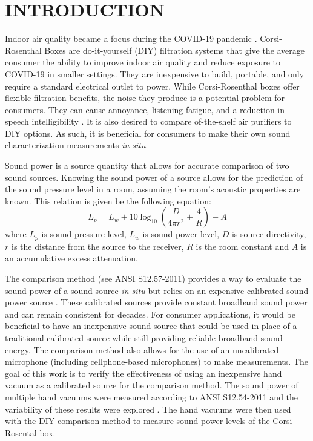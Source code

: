 \documentclass[letterpaper,12pt]{article}
\begin{document}
\section{INTRODUCTION}
\noindent

Indoor air quality became a focus during the COVID-19 pandemic \cite{mousavi2020covid, zhao2020air}.
Corsi-Rosenthal Boxes are do-it-yourself (DIY) filtration systems that give the average consumer the ability to improve indoor air quality and reduce exposure to COVID-19 in smaller settings\cite{dodson2022does, dal2022characterizing,rosenthal2022variation}. They are inexpensive to build, portable, and only require a standard electrical outlet to power. While Corsi-Rosenthal boxes offer flexible filtration benefits, the noise they produce is a potential problem for consumers. They can cause annoyance, listening fatigue, and a reduction in speech intelligibility \cite{houtgast1980predicting}. It is also desired to compare of-the-shelf air purifiers to DIY options. As such, it is beneficial for consumers to make their own sound characterization measurements \textit{in situ}.

Sound power is a source quantity that allows for accurate comparison of two sound sources. Knowing the sound power of a source allows for the prediction of the sound pressure level in a room, assuming the room's acoustic properties are known. This relation is given be the following equation:
\begin{equation}
    L_p = L_w + 10\log_{10} \left(\frac{D}{4\pi r^2} + \frac{4}{R} \right)-A 
\end{equation}
where $L_p$ is sound pressure level, $L_w$ is sound power level, $D$ is source directivity, $ r$ is the distance from the source to the receiver, $R$ is the room constant and $A$ is an accumulative excess attenuation.   

The comparison method (see ANSI S12.57-2011) provides a way to evaluate the sound power of a sound source \textit{in situ} but relies on an expensive calibrated sound power source \cite{S12.57-2011}. These calibrated sources provide constant broadband sound power and can remain consistent for decades.  For consumer applications, it would be beneficial to have an inexpensive sound source that could be used in place of a traditional calibrated source while still providing reliable broadband sound energy. The comparison method also allows for the use of an uncalibrated microphone (including cellphone-based microphones) to make measurements. The goal of this work is to verify the effectiveness of using an inexpensive hand vacuum as a calibrated source for the comparison method. The sound power of multiple hand vacuums were measured according to ANSI S12.54-2011 and the variability of these results were explored  \cite{S12.54-2011}. The hand vacuums were then used with the DIY comparison method to measure sound power levels of the Corsi-Rosental box. 
 
\end{document}
